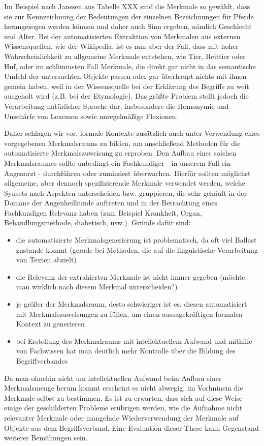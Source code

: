 \documentclass[pagesize,DIV=calc,12pt,draft]{scrreprt}
\begin{document}
Im Beispiel nach Janssen aus Tabelle XXX sind die Merkmale so gewählt, dass sie zur Kennzeichnung der Bedeutungen der einzelnen Bezeichnungen für Pferde herangezogen werden können und daher auch Sinn ergeben, nämlich Geschlecht und Alter.
Bei der automatisierten Extraktion von Merkmalen aus externen Wissensquellen, wie der Wikipedia, ist es nun aber der Fall, dass mit hoher Wahrscheinlichkeit zu allgemeine Merkmale entstehen, wie Tier, Reittier oder Huf, oder im schlimmsten Fall Merkmale, die direkt gar nicht in das semantische Umfeld der untersuchten Objekte passen oder gar überhaupt nichts mit ihnen gemein haben, weil in der Wissensquelle bei der Erklärung des Begriffs zu weit ausgeholt wird (z.B. bei der Etymologie).
Das größte Problem stellt jedoch die Verarbeitung natürlicher Sprache dar, insbesondere die Homonymie und Unschärfe von Lexemen sowie unregelmäßige Flexionen.

Daher schlagen wir vor, formale Kontexte zusätzlich auch unter Verwendung eines vorgegebenen Merkmalsraums zu bilden, um anschließend Methoden für die automatisierte Merkmalszuweisung zu erproben.
Den Aufbau eines solchen Merkmalsraumes sollte unbedingt ein Fachkundiger - in unserem Fall ein Augenarzt - durchführen oder zumindest überwachen. 
Hierfür sollten möglichst allgemeine, aber dennoch spezifizierende Merkmale verwendet werden, welche Synsets nach Aspekten unterscheiden bzw. gruppieren, die sehr gehäuft in der Domäne der Augenheilkunde auftreten und in der Betrachtung eines Fachkundigen Relevanz haben (zum Beispiel Krankheit, Organ, Behandlungsmethode, diabetisch, usw.). 
Gründe dafür sind:
\begin{itemize}
\item die automatisierte Merkmalsgenerierung ist problematisch, da oft viel Ballast zustande kommt (gerade bei Methoden, die auf die linguistische Verarbeitung von Texten abzielt)
\item die Relevanz der extrahierten Merkmale ist nicht immer gegeben (möchte man wirklich nach diesem Merkmal unterscheiden?)
\item je größer der Merkmalsraum, desto schwieriger ist es, diesen automatisiert mit Merkmalszuweisungen zu füllen, um einen aussagekräftigen formalen Kontext zu generieren
\item bei Erstellung des Merkmalraums mit intellektuellem Aufwand und mithilfe von Fachwissen hat man deutlich mehr Kontrolle über die Bildung des Begriffverbandes
\end{itemize}
Da man ohnehin nicht um intellektuellen Aufwand beim Aufbau einer Merkmalsmenge herum kommt erscheint es nicht abwegig, im Vorhninein die Merkmale selbst zu bestimmen.
Es ist zu erwarten, dass sich auf diese Weise einige der geschilderten Probleme erübrigen werden, wie die Aufnahme nicht relevanter Merkmale oder mangelnde Wiederverwendung der Merkmale auf Objekte aus dem Begriffsverband. 
Eine Evaluation dieser These kann Gegenstand weiterer Bemühungen sein. 
\end{document}
